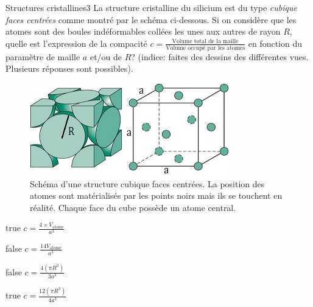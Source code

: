 \documentclass[11pt]{article}
\begin{document}
        \begin{question}{31}{Structures cristallines}{3}{}
            La structure cristalline du silicium est du type \emph{cubique faces centrées} comme montré par le schéma ci-dessous. Si on considère que les atomes sont des boules indéformables collées les unes aux autres de rayon $R$, quelle est l'expression de la compacité $c = \frac{\text{Volume total de la maille}}{\text{Volume occupé par les atomes}}$ en fonction du paramètre de maille $a$ et/ou de $R$? (indice: faites des dessins des différentes vues. Plusieurs réponses sont possibles).
            \begin{figure}
                \centering
                \includegraphics[height = 4cm]{Antoine/Figures_Antoine/FCC.png}
                \caption{Schéma d'une structure cubique faces centrées. La position des atomes sont matérialisés par les points noirs mais ils se touchent en réalité.  Chaque face du cube possède un atome central.}
            \end{figure}
        \end{question}
        \begin{reponses} 
            \item[true] $c = \frac{4\times V_\text{atome}}{a^3}$
            \item[false] $c = \frac{14V_\text{atome}}{a^3}$
            \item[false] $c = \frac{4(\pi R^3)}{3a^3}$
    	    \item[true] $c = \frac{12(\pi R^3)}{4a^3}$
        \end{reponses}
        
\end{document}
